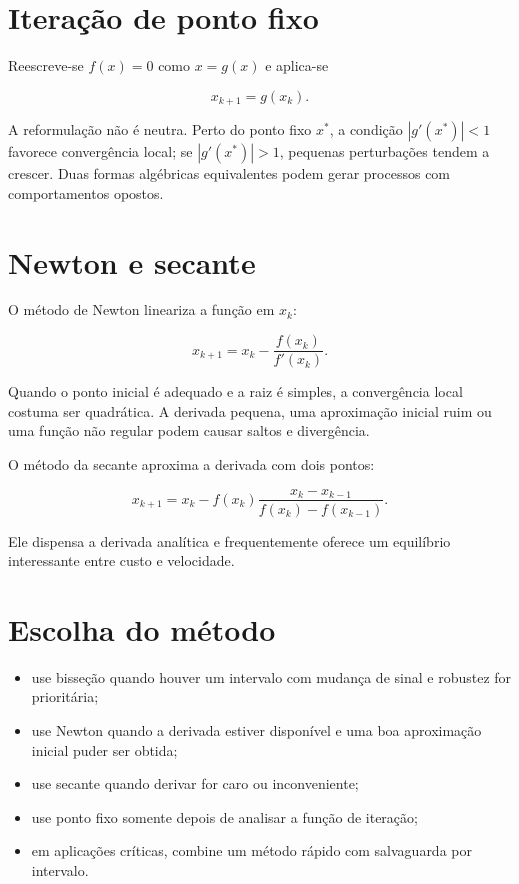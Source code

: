 \documentclass[12pt,a4paper,openany]{book}
\begin{document}
\section{Iteração de ponto fixo}



Reescreve-se $f(x)=0$ como $x=g(x)$ e aplica-se



\[x_{k+1}=g(x_k).\]



A reformulação não é neutra. Perto do ponto fixo $x^*$, a condição $|g'(x^*)|<1$ favorece convergência local; se $|g'(x^*)|>1$, pequenas perturbações tendem a crescer. Duas formas algébricas equivalentes podem gerar processos com comportamentos opostos.



\section{Newton e secante}



O método de Newton lineariza a função em $x_k$:



\[x_{k+1}=x_k-\frac{f(x_k)}{f'(x_k)}.\]



Quando o ponto inicial é adequado e a raiz é simples, a convergência local costuma ser quadrática. A derivada pequena, uma aproximação inicial ruim ou uma função não regular podem causar saltos e divergência.



O método da secante aproxima a derivada com dois pontos:



\[x_{k+1}=x_k-f(x_k)\frac{x_k-x_{k-1}}{f(x_k)-f(x_{k-1})}.\]



Ele dispensa a derivada analítica e frequentemente oferece um equilíbrio interessante entre custo e velocidade.



\section{Escolha do método}



\begin{itemize}
\item use bisseção quando houver um intervalo com mudança de sinal e robustez for prioritária;
\item use Newton quando a derivada estiver disponível e uma boa aproximação inicial puder ser obtida;
\item use secante quando derivar for caro ou inconveniente;
\item use ponto fixo somente depois de analisar a função de iteração;
\item em aplicações críticas, combine um método rápido com salvaguarda por intervalo.
\end{itemize}
\end{document}
